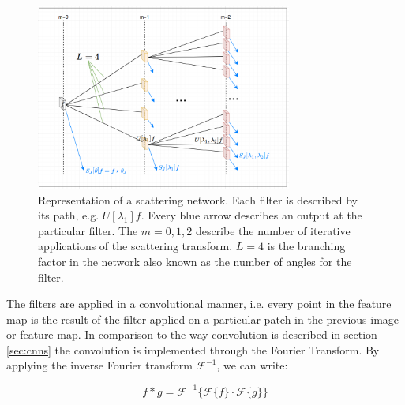 \begin{figure}[!htb]
	\centering
	\includegraphics[width = 0.75\textwidth]{images/scattering_network_overview.png}
	\caption{Representation of a scattering network. Each filter is described by its path, e.g. $U[\lambda_1]f$. Every blue arrow describes an output at the particular filter. The $m=0,1,2$ describe the number of iterative applications of the scattering transform. $L=4$ is the branching factor in the network also known as the number of angles for the filter.}
	\label{fig:scattering_network}
\end{figure}

The filters are applied in a convolutional manner, i.e. every point in the feature map is the result of the filter applied on a particular patch in the previous image or feature map. In comparison to the way convolution is described in section \ref{sec:cnns} the convolution is implemented through the Fourier Transform. By applying the inverse Fourier transform  ${\mathcal F}^{-1}$, we can write:

$$ f*g={\mathcal {F}}^{-1}{\big \{}{\mathcal {F}}\{f\}\cdot {\mathcal {F}}\{g\}{\big \}}$$

